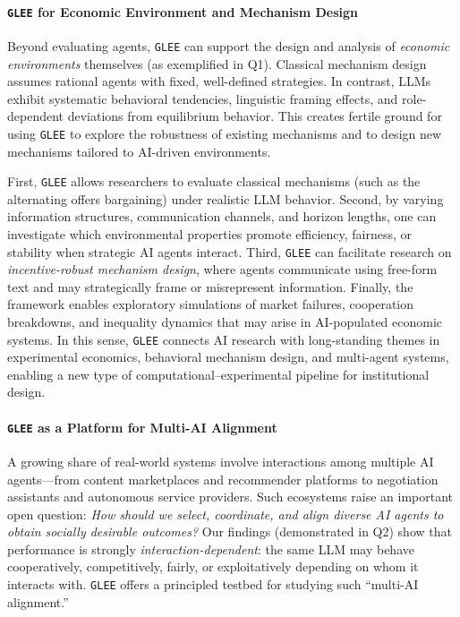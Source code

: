 \paragraph{\texttt{GLEE} for Economic Environment and Mechanism Design}
Beyond evaluating agents, \texttt{GLEE} can support the design and analysis of \emph{economic environments} 
themselves (as exemplified in Q1). Classical mechanism design assumes rational agents with fixed, well-defined strategies. In contrast, 
LLMs exhibit systematic behavioral tendencies, linguistic framing effects, and role-dependent deviations from 
equilibrium behavior. This creates fertile ground for using \texttt{GLEE} to explore the robustness of existing 
mechanisms and to design new mechanisms tailored to AI-driven environments.

First, \texttt{GLEE} allows researchers to evaluate classical mechanisms (such as the alternating offers bargaining) under realistic LLM behavior. Second, by varying information structures, communication 
channels, and horizon lengths, one can investigate which environmental properties promote efficiency, fairness, 
or stability when strategic AI agents interact. Third, \texttt{GLEE} can facilitate research on 
\emph{incentive-robust mechanism design}, where agents communicate using free-form text and may strategically 
frame or misrepresent information. Finally, the framework enables exploratory simulations of market failures, 
cooperation breakdowns, and inequality dynamics that may arise in AI-populated economic systems.
In this sense, \texttt{GLEE} connects AI research with long-standing themes in experimental economics, behavioral 
mechanism design, and multi-agent systems, enabling a new type of computational--experimental pipeline for 
institutional design.

\paragraph{\texttt{GLEE} as a Platform for Multi-AI Alignment}
A growing share of real-world systems involve interactions among multiple AI agents---from content marketplaces 
and recommender platforms to negotiation assistants and autonomous service providers. Such ecosystems raise an 
important open question: \emph{How should we select, coordinate, and align diverse AI agents to obtain socially 
desirable outcomes?} Our findings (demonstrated in Q2) show that performance is strongly \emph{interaction-dependent}: the same LLM 
may behave cooperatively, competitively, fairly, or exploitatively depending on whom it interacts with. 
\texttt{GLEE} offers a principled testbed for studying such ``multi-AI alignment.''

